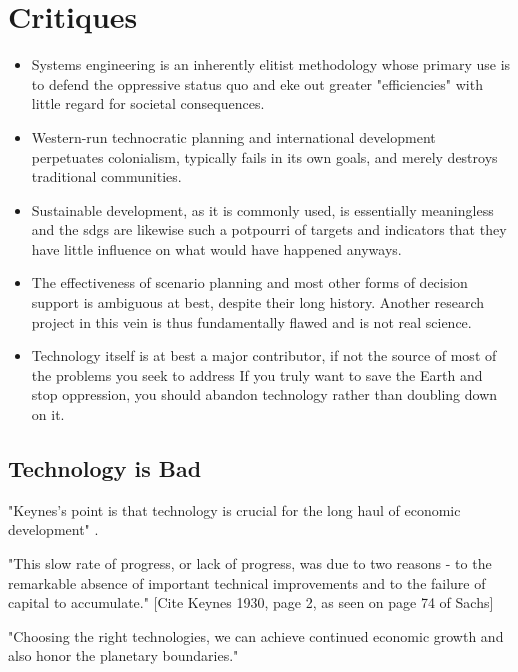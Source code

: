 \section{Critiques}

\begin{itemize} \setlength{\itemsep}{0pt} \setlength{\parskip}{0pt} 
	\item{Systems engineering is an inherently elitist methodology whose primary use is to defend the oppressive status quo and eke out greater "efficiencies" with little regard for societal consequences.}
	\item{Western-run technocratic planning and international development perpetuates colonialism, typically fails in its own goals, and merely destroys traditional communities.}
	\item{Sustainable development, as it is commonly used, is essentially meaningless and the \acp{sdg} are likewise such a potpourri of targets and indicators that they have little influence on what would have happened anyways.}
	\item{The effectiveness of scenario planning and most other forms of decision support is ambiguous at best, despite their long history. Another research project in this vein is thus fundamentally flawed and is not real science.}
	\item{Technology itself is at best a major contributor, if not the source of most of the problems you seek to address If you truly want to save the Earth and stop oppression, you should abandon technology rather than doubling down on it.}
\end{itemize}



\subsection{Technology is Bad}

"Keynes's point is that technology is crucial for the long haul of economic development" \cite{sachsAgeSustainableDevelopment2015}.

"This slow rate of progress, or lack of progress, was due to two reasons - to the remarkable absence of important technical improvements and to the failure of capital to accumulate." [Cite Keynes 1930, page 2, as seen on page 74 of Sachs]

"Choosing the right technologies, we can achieve continued economic growth and also honor the planetary boundaries." \cite{sachsAgeSustainableDevelopment2015}

